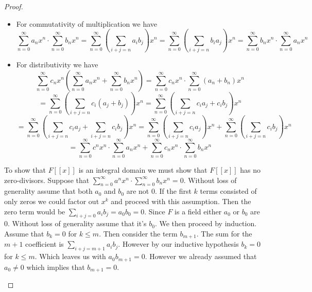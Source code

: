 \documentclass[10pt]{article}
\theoremstyle{plain}
\theoremstyle{remark}
\begin{document}
\begin{proof}
\begin{enumerate}
\begin{itemize}
\[        \sum_{i+j=n}
        \left(
          \sum_{h+k=i}a_hb_k
        \right) c_j
      \right)x^n \]\[
    = \sum_{n=0}^\infty 
    \left(
      \sum_{i+j=n}a_i
      \left(
       \sum_{j+k=j} b_hc_k
      \right)
    \right)x^n
    =
    \sum_{n=0}^\infty a_nx^n\cdot 
    \left(
      \sum_{n=0}^\infty b_nx^n\cdot \sum_{n=0}^\infty c_nx^n
    \right)
  \]
    \item For commutativity of multiplication we have
      \[ \sum_{n=0}^\infty a_nx^n\cdot\sum_{n=0}^\infty b_nx^n=\sum_{n=0}^\infty 
        \left(
          \sum_{i+j=n}a_ib_j
        \right)x^n
      =\sum_{n=0}^\infty 
        \left(
          \sum_{i+j=n}b_ia_j
        \right)x^n
      = \sum_{n=0}^\infty b_nx^n\cdot \sum_{n=0}^\infty a_nx^n\]
    \item For distributivity we have
      \[ \sum_{n=0}^\infty c_nx^n
        \left(
          \sum_{n=0}^\infty a_nx^n+\sum_{n=0}^\infty b_nx^n
        \right)
        =
        \sum_{n=0}^\infty c_nx^n\cdot \sum_{n=0}^\infty (a_n+b_n)x^n \]\[
        =
      \sum_{n=0}^\infty 
      \left(
        \sum_{i+j=n}c_i(a_j+b_j)
      \right)x^n
      =
      \sum_{n=0}^\infty 
    \left(
      \sum_{i+j=n}c_ia_j+c_ib_j
    \right)x^n \]\[
    =
    \sum_{n=0}^\infty 
    \left(
      \sum_{i+j=n}c_ia_j+\sum_{i+j=n}c_ib_j
    \right)x^n
    =
    \sum_{n=0}^\infty
    \left(
      \sum_{i+j=n}c_ia_j
    \right)x^n
    +
    \sum_{n=0}^\infty
    \left(
      \sum_{i+j=n}c_ib_j
    \right)x^n \]\[
    =
    \sum_{n=0}^\infty c^nx^n\cdot\sum_{n=0}^\infty a_nx^n+\sum_{n=0}^\infty c_nx^n\cdot\sum_{n=0}^\infty b_nx^n
  \]
    \end{itemize}

    To show that $F[[x]]$ is an integral domain we must show that
    $F[[x]]$ has no zero-divisors. Suppose that $\sum_{n=0}^\infty a^nx^n\cdot\sum_{n=0}^\infty b_nx^n=0$.
    Without loss of generality assume that both $a_0$ and $b_0$ are not $0$.
    If the first $k$ terms consisted of only zeros we could factor out $x^k$ and
    proceed with this assumption. Then the zero term would
    be $\sum_{i+j=0}a_ib_j=a_0b_0=0$. Since $F$ is a field either $a_0$ or $b_0$ are $0$.
    Without loss of generality assume that it's $b_0$. We then proceed by induction.
    Assume that $b_k=0$ for $k\leq m$. Then consider the term $b_{m+1}$. The sum
    for the $m+1$ coefficient is $\sum_{i+j=m+1}a_ib_j$. However by our inductive
    hypothesis $b_k=0$ for $k\leq m$. Which leaves us with $a_0b_{m+1}=0$. However
    we already assumed that $a_0\neq 0$ which implies that $b_{m+1}=0$.


\end{enumerate}
\end{proof}
\end{document}
